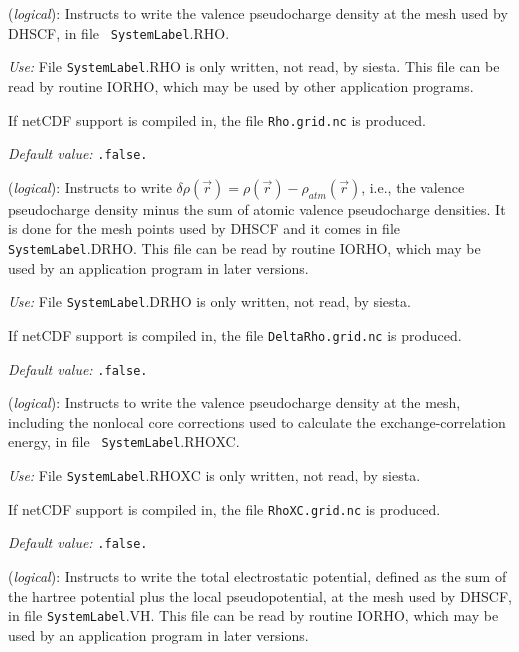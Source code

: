 \documentclass[11pt]{article}
\begin{document}
\begin{description}
\itemsep 10pt
\parsep 0pt

\item[{\bf SaveRho}] ({\it logical}):  Instructs to write the
  valence pseudocharge density at the mesh used by DHSCF, in file {\tt
    SystemLabel}.RHO.

{\it Use:} File {\tt SystemLabel}.RHO is only written, not read, by siesta.
This file can be read by routine IORHO, which may be used by other
application programs.

If netCDF support is compiled in, the file {\tt Rho.grid.nc} is produced.

{\it Default value:} {\tt .false.}


\item[{\bf SaveDeltaRho}] ({\it logical}):
Instructs to write $\delta \rho(\vec r) = \rho(\vec r) - \rho_{atm}(\vec r)$,
i.e., the valence pseudocharge density minus the sum of atomic valence
pseudocharge densities. It is done for the mesh points used by DHSCF and it
comes in file {\tt SystemLabel}.DRHO. This file can be read by routine IORHO,
which may be used by an application program in later versions.

{\it Use:} File {\tt SystemLabel}.DRHO is only written, not read, by siesta.

If netCDF support is compiled in, the file {\tt DeltaRho.grid.nc} is produced.

{\it Default value:} {\tt .false.}


\item[{\bf SaveRhoXC}] ({\it logical}):  Instructs to write the
  valence pseudocharge density at the mesh, including the nonlocal
core corrections used to calculate the exchange-correlation energy, 
in file {\tt
    SystemLabel}.RHOXC.

{\it Use:} File {\tt SystemLabel}.RHOXC is only written, not read, by siesta.

If netCDF support is compiled in, the file {\tt RhoXC.grid.nc} is produced.

{\it Default value:} {\tt .false.}


\item[{\bf SaveElectrostaticPotential}] ({\it logical}):
Instructs to write the total electrostatic potential, defined as the
sum of the hartree potential plus the local pseudopotential, at the
mesh used by DHSCF,
in file {\tt SystemLabel}.VH. This file can be read by routine IORHO,
which may be used by an application program in later versions.


\end{description}
\end{document}
